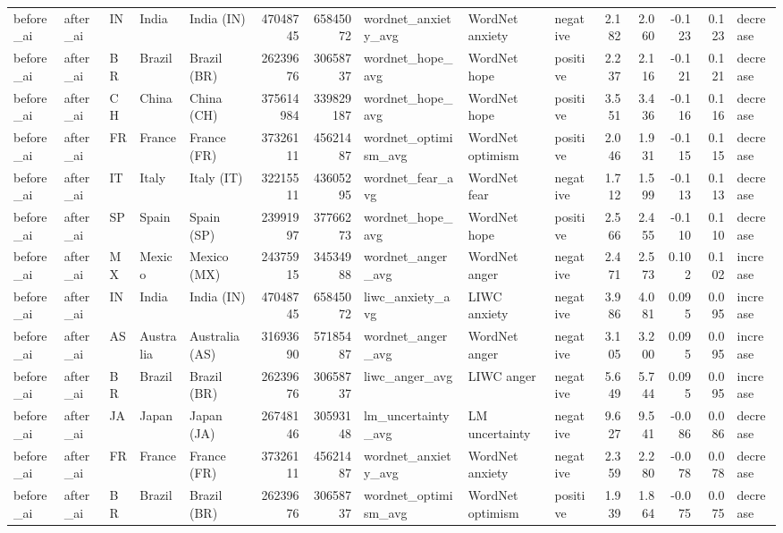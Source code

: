 \begin{tabular}{lllllrrlllrrrrl}
before\_ai & after\_ai & IN & India & India (IN) & 47048745 & 65845072 & wordnet\_anxiety\_avg & WordNet anxiety & negative & 2.182 & 2.060 & -0.123 & 0.123 & decrease \\
before\_ai & after\_ai & BR & Brazil & Brazil (BR) & 26239676 & 30658737 & wordnet\_hope\_avg & WordNet hope & positive & 2.237 & 2.116 & -0.121 & 0.121 & decrease \\
before\_ai & after\_ai & CH & China & China (CH) & 375614984 & 339829187 & wordnet\_hope\_avg & WordNet hope & positive & 3.551 & 3.436 & -0.116 & 0.116 & decrease \\
before\_ai & after\_ai & FR & France & France (FR) & 37326111 & 45621487 & wordnet\_optimism\_avg & WordNet optimism & positive & 2.046 & 1.931 & -0.115 & 0.115 & decrease \\
before\_ai & after\_ai & IT & Italy & Italy (IT) & 32215511 & 43605295 & wordnet\_fear\_avg & WordNet fear & negative & 1.712 & 1.599 & -0.113 & 0.113 & decrease \\
before\_ai & after\_ai & SP & Spain & Spain (SP) & 23991997 & 37766273 & wordnet\_hope\_avg & WordNet hope & positive & 2.566 & 2.455 & -0.110 & 0.110 & decrease \\
before\_ai & after\_ai & MX & Mexico & Mexico (MX) & 24375915 & 34534988 & wordnet\_anger\_avg & WordNet anger & negative & 2.471 & 2.573 & 0.102 & 0.102 & increase \\
before\_ai & after\_ai & IN & India & India (IN) & 47048745 & 65845072 & liwc\_anxiety\_avg & LIWC anxiety & negative & 3.986 & 4.081 & 0.095 & 0.095 & increase \\
before\_ai & after\_ai & AS & Australia & Australia (AS) & 31693690 & 57185487 & wordnet\_anger\_avg & WordNet anger & negative & 3.105 & 3.200 & 0.095 & 0.095 & increase \\
before\_ai & after\_ai & BR & Brazil & Brazil (BR) & 26239676 & 30658737 & liwc\_anger\_avg & LIWC anger & negative & 5.649 & 5.744 & 0.095 & 0.095 & increase \\
before\_ai & after\_ai & JA & Japan & Japan (JA) & 26748146 & 30593148 & lm\_uncertainty\_avg & LM uncertainty & negative & 9.627 & 9.541 & -0.086 & 0.086 & decrease \\
before\_ai & after\_ai & FR & France & France (FR) & 37326111 & 45621487 & wordnet\_anxiety\_avg & WordNet anxiety & negative & 2.359 & 2.280 & -0.078 & 0.078 & decrease \\
before\_ai & after\_ai & BR & Brazil & Brazil (BR) & 26239676 & 30658737 & wordnet\_optimism\_avg & WordNet optimism & positive & 1.939 & 1.864 & -0.075 & 0.075 & decrease \\

\end{tabular}
